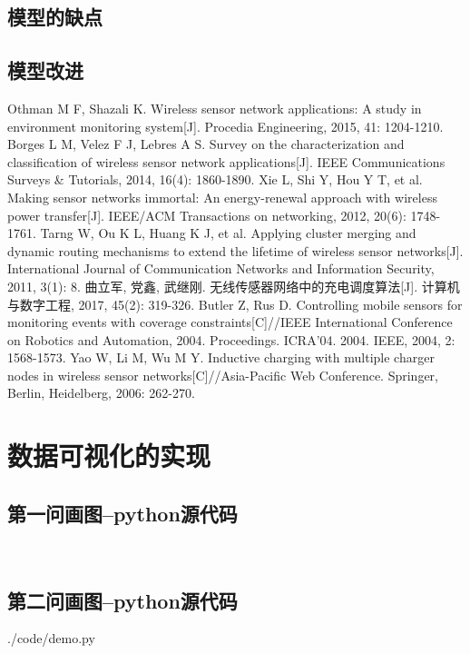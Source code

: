 \documentclass{whutmod}
\begin{document}
		\subsection{模型的缺点}

  		\subsection{模型改进}

  
  
 
	\newpage	%
	\nocite{*}		%
	\begin{thebibliography}{9}%
		Othman M F, Shazali K. Wireless sensor network applications: A study in environment monitoring system[J]. Procedia Engineering, 2015, 41: 1204-1210.
		Borges L M, Velez F J, Lebres A S. Survey on the characterization and classification of wireless sensor network applications[J]. IEEE Communications Surveys \& Tutorials, 2014, 16(4): 1860-1890.
		Xie L, Shi Y, Hou Y T, et al. Making sensor networks immortal: An energy-renewal approach with wireless power transfer[J]. IEEE/ACM Transactions on networking, 2012, 20(6): 1748-1761.
		Tarng W, Ou K L, Huang K J, et al. Applying cluster merging and dynamic routing mechanisms to extend the lifetime of wireless sensor networks[J]. International Journal of Communication Networks and Information Security, 2011, 3(1): 8.
		曲立军, 党鑫, 武继刚. 无线传感器网络中的充电调度算法[J]. 计算机与数字工程, 2017, 45(2): 319-326.
		Butler Z, Rus D. Controlling mobile sensors for monitoring events with coverage constraints[C]//IEEE International Conference on Robotics and Automation, 2004. Proceedings. ICRA'04. 2004. IEEE, 2004, 2: 1568-1573.
		Yao W, Li M, Wu M Y. Inductive charging with multiple charger nodes in wireless sensor networks[C]//Asia-Pacific Web Conference. Springer, Berlin, Heidelberg, 2006: 262-270.
	
	\end{thebibliography}

	\newpage
	\appendix %
	\section{数据可视化的实现}
		\subsection*{第一问画图--python源代码}
			\begin{lstlisting}[language=python]
			
			\end{lstlisting}
			
		\subsection*{第二问画图--python源代码}
			 {./code/demo.py}
\end{document}
